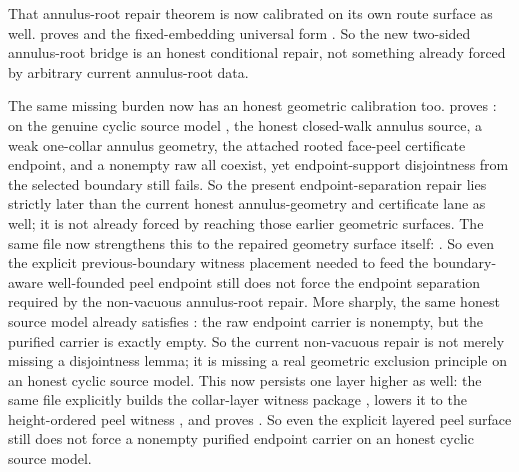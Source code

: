 \documentclass[11pt]{article}
\begin{document}
That annulus-root repair theorem is now calibrated on its own route surface as
well.   proves
and the fixed-embedding universal form
.
So the new two-sided annulus-root bridge is an honest conditional repair, not
something already forced by arbitrary current annulus-root data.

The same missing burden now has an honest geometric calibration too.
 proves
:
on the genuine cyclic source model , the
honest closed-walk annulus source, a weak one-collar annulus geometry, the
attached rooted face-peel certificate endpoint, and a nonempty raw
 all coexist, yet endpoint-support
disjointness from the selected boundary still fails.  So the present
endpoint-separation repair lies strictly later than the current honest
annulus-geometry and certificate lane as well; it is not already forced by
reaching those earlier geometric surfaces.  The same file now strengthens this
to the repaired geometry surface itself:
.
So even the explicit previous-boundary witness placement needed to feed the
boundary-aware well-founded peel endpoint still does not force the endpoint
separation required by the non-vacuous annulus-root repair.  More sharply, the
same honest source model already satisfies
:
the raw endpoint carrier is nonempty, but the purified carrier
 is exactly empty.  So the
current non-vacuous repair is not merely missing a disjointness lemma; it is
missing a real geometric exclusion principle on an honest cyclic source model.
This now persists one layer higher as well: the same file explicitly builds the
collar-layer witness package
, lowers it to the
height-ordered peel witness
, and proves
.
So even the explicit layered peel surface still does not force a nonempty
purified endpoint carrier on an honest cyclic source model.
\end{document}
